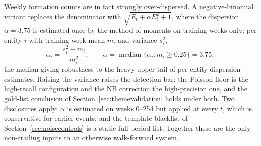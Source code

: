 \documentclass[a4paper,12pt]{report}
\begin{document}
Weekly formation counts are in fact strongly over-dispersed. A
negative-binomial variant replaces the denominator with
$\sqrt{E_t + \alpha E_t^2 + 1}$, where the dispersion $\alpha = 3.75$ is
estimated once by the method of moments on training weeks only:
per entity $i$ with training-week mean $m_i$ and variance $s_i^2$,
\begin{equation}
\alpha_i = \frac{s_i^2 - m_i}{m_i^2}, \qquad
\alpha = \operatorname{median}\{ \alpha_i : m_i \geq 0.25 \} = 3.75,
\label{eq:nbmom}
\end{equation}
the median giving robustness to the heavy upper tail of per-entity
dispersion estimates. Raising the
variance raises the detection bar: the Poisson floor is the high-recall
configuration and the NB correction the high-precision one, and the gold-list
conclusion of Section~\ref{sec:themevalidation} holds under both. Two
disclosures apply: $\alpha$ is estimated on weeks 0--254 but applied at every
$t$, which is conservative for earlier events; and the template blacklist of
Section~\ref{sec:noisecontrols} is a static full-period list. Together these
are the only non-trailing inputs to an otherwise walk-forward system.
\end{document}
